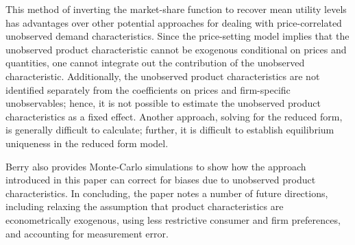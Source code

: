 \documentclass{article}
\begin{document}
This method of inverting the market-share function to recover mean utility levels has advantages over other potential approaches for dealing with price-correlated unobserved demand characteristics. Since the price-setting model implies that the unobserved product characteristic cannot be exogenous conditional on prices and quantities, one cannot integrate out the contribution of the unobserved characteristic. Additionally, the unobserved product characteristics are not identified separately from the coefficients on prices and firm-specific unobservables; hence, it is not possible to estimate the unobserved product characteristics as a fixed effect. Another approach, solving for the reduced form, is generally difficult to calculate; further, it is difficult to establish equilibrium uniqueness in the reduced form model.

Berry also provides Monte-Carlo simulations to show how the approach introduced in this paper can correct for biases due to unobserved product characteristics. In concluding, the paper notes a number of future directions, including relaxing the assumption that product characteristics are econometrically exogenous, using less restrictive consumer and firm preferences, and accounting for measurement error. 
\end{document}
